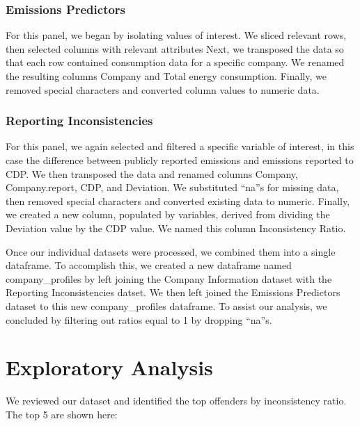\documentclass[
  12pt,
]{article}
\begin{document}
\hypertarget{emissions-predictors}{%
\subsubsection{Emissions Predictors}\label{emissions-predictors}}

For this panel, we began by isolating values of interest. We sliced
relevant rows, then selected columns with relevant attributes Next, we
transposed the data so that each row contained consumption data for a
specific company. We renamed the resulting columns Company and Total
energy consumption. Finally, we removed special characters and converted
column values to numeric data.

\hypertarget{reporting-inconsistencies}{%
\subsubsection{Reporting
Inconsistencies}\label{reporting-inconsistencies}}

For this panel, we again selected and filtered a specific variable of
interest, in this case the difference between publicly reported
emissions and emissions reported to CDP. We then transposed the data and
renamed columns Company, Company.report, CDP, and Deviation. We
substituted ``na''s for missing data, then removed special characters
and converted existing data to numeric. Finally, we created a new
column, populated by variables, derived from dividing the Deviation
value by the CDP value. We named this column Inconsistency Ratio.

Once our individual datasets were processed, we combined them into a
single dataframe. To accomplish this, we created a new dataframe named
company\_profiles by left joining the Company Information dataset with
the Reporting Inconsistencies datset. We then left joined the Emissions
Predictors dataset to this new company\_profiles dataframe. To assist
our analysis, we concluded by filtering out ratios equal to 1 by
dropping ``na''s.

\newpage

\hypertarget{exploratory-analysis}{%
\section{Exploratory Analysis}\label{exploratory-analysis}}

We reviewed our dataset and identified the top offenders by
inconsistency ratio. The top 5 are shown here:
\end{document}
